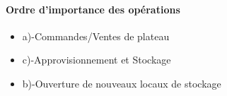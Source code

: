 \paragraph {Ordre d'importance des opérations} 

\begin{itemize}
    \item a)-Commandes/Ventes de plateau
    \item c)-Approvisionnement et Stockage
    \item b)-Ouverture de nouveaux locaux de stockage
\end{itemize}



